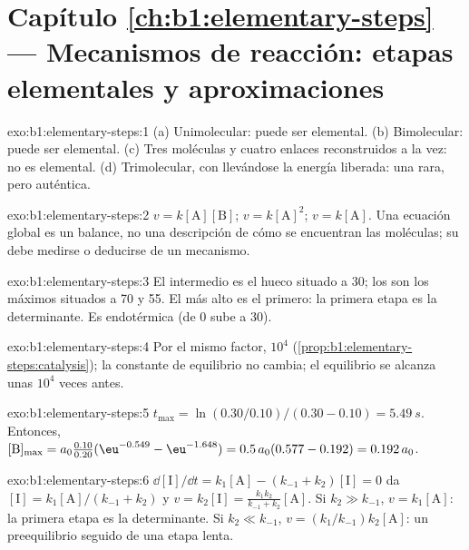 \section*{Capítulo \ref{ch:b1:elementary-steps} --- Mecanismos de reacción: etapas elementales y aproximaciones}

\begin{solution}{exo:b1:elementary-steps:1}
(a) Unimolecular: puede ser elemental. (b) Bimolecular: puede ser
elemental. (c) Tres moléculas y cuatro enlaces reconstruidos a la vez: no
es elemental. (d) Trimolecular, con  llevándose la energía
liberada: una  rara, pero auténtica.
\end{solution}

\begin{solution}{exo:b1:elementary-steps:2}
$v = k[\mathrm{A}][\mathrm{B}]$; $v = k[\mathrm{A}]^2$; $v = k[\mathrm{A}]$.
Una ecuación global es un balance, no una descripción de cómo se
encuentran las moléculas; su  debe medirse o deducirse de
un mecanismo.
\end{solution}

\begin{solution}{exo:b1:elementary-steps:3}
El intermedio es el hueco situado a 30; los  son los
máximos situados a 70 y 55. El  más alto es el
primero: la primera etapa es la determinante. Es endotérmica (de 0 sube a
30).
\end{solution}

\begin{solution}{exo:b1:elementary-steps:4}
Por el mismo factor, $10^4$ (\cref{prop:b1:elementary-steps:catalysis});
la constante de equilibrio no cambia; el equilibrio se alcanza unas
$10^4$ veces antes.
\end{solution}

\begin{solution}{exo:b1:elementary-steps:5}
$t_{\max} = \ln(0.30/0.10)/(0.30 - 0.10) = \qty{5.49}{s}$. Entonces,
$[\mathrm{B}]_{\max} = a_0\frac{0.10}{0.20}(\eu^{-0.549} - \eu^{-1.648}) =
0.5\,a_0(0.577 - 0.192) = 0.192\,a_0$.
\end{solution}

\begin{solution}{exo:b1:elementary-steps:6}
$\dd[\mathrm{I}]/\dd t = k_1[\mathrm{A}] - (k_{-1} + k_2)[\mathrm{I}] = 0$
da $[\mathrm{I}] = k_1[\mathrm{A}]/(k_{-1} + k_2)$ y $v = k_2[\mathrm{I}]
= \frac{k_1k_2}{k_{-1}+k_2}[\mathrm{A}]$. Si $k_2 \gg k_{-1}$, $v =
k_1[\mathrm{A}]$: la primera etapa es la determinante. Si $k_2 \ll k_{-1}$,
$v = (k_1/k_{-1})k_2[\mathrm{A}]$: un preequilibrio seguido de una etapa
lenta.
\end{solution}

